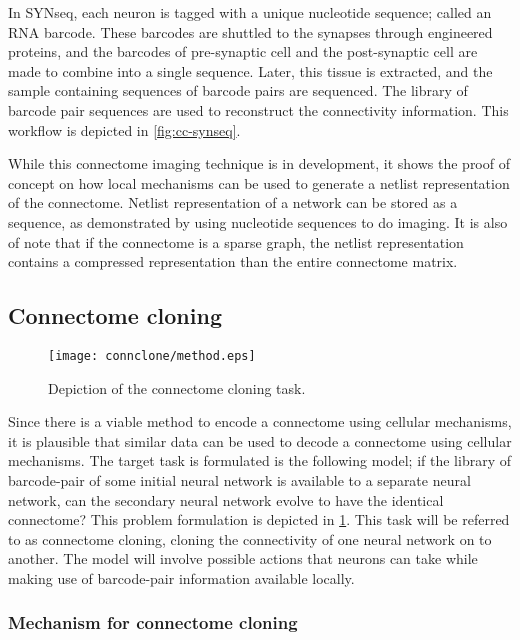 \documentclass[../dissertation.tex]{subfiles}
\begin{document}
In SYNseq, each neuron is tagged with a unique nucleotide sequence; called an RNA barcode.
These barcodes are shuttled to the synapses through engineered proteins, and the barcodes of pre-synaptic cell and the post-synaptic cell are made to combine into a single sequence.
Later, this tissue is extracted, and the sample containing sequences of barcode pairs are sequenced.
The library of barcode pair sequences are used to reconstruct the connectivity information.
This workflow is depicted in \cref{fig:cc-synseq}.

While this connectome imaging technique is in development, it shows the proof of concept on how local mechanisms can be used to generate a netlist representation of the connectome.
Netlist representation of a network can be stored as a sequence, as demonstrated by using nucleotide sequences to do imaging.
It is also of note that if the connectome is a sparse graph, the netlist representation contains a compressed representation than the entire connectome matrix.

\subsection{Connectome cloning}

\begin{figure}[ht]
    \centering
    \texttt{[image: connclone/method.eps]}
    \caption{Depiction of the connectome cloning task.}
    \label{fig:cc-method}
\end{figure}

Since there is a viable method to encode a connectome using cellular mechanisms, it is plausible that similar data can be used to decode a connectome using cellular mechanisms.
The target task is formulated is the following model; if the library of barcode-pair of some initial neural network is available to a separate neural network, can the secondary neural network evolve to have the identical connectome?
This problem formulation is depicted in \cref{fig:cc-method}.
This task will be referred to as connectome cloning, cloning the connectivity of one neural network on to another.
The model will involve possible actions that neurons can take while making use of barcode-pair information available locally.

\subsubsection{Mechanism for connectome cloning}
\end{document}
